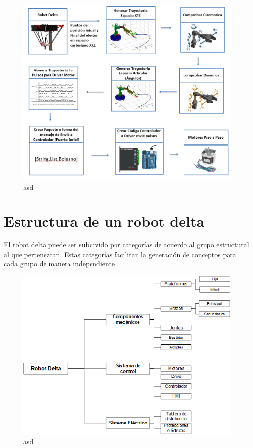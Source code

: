     \begin{figure}[h]
        \centering
        \includegraphics[width=1.0\linewidth]{Main/Chapter3/Images3/3-1/diagrama-de-flujo-robot.png}
        \caption{asd}
        \label{f:Cap3-1_diagrama_de_flujo_robot_accion}
    \end{figure}

        \newpage
\section{Estructura de un robot delta}

    El robot delta puede ser subdivido por categorías de acuerdo al grupo estructural al que pertenezcan. Estas categorías facilitan la generación de conceptos para cada grupo de manera independiente \cite{Robot_parelelo_tipo}
    
    \begin{figure}[h]
        \centering
        \includegraphics[width=0.85\linewidth]{Main/Chapter3/Images3/3-2/esquema-categorias-estructura.png}
        \caption{asd}
        \label{f:Cap3-2_esquema_arquitectura_robot_delta}
    \end{figure}
    
